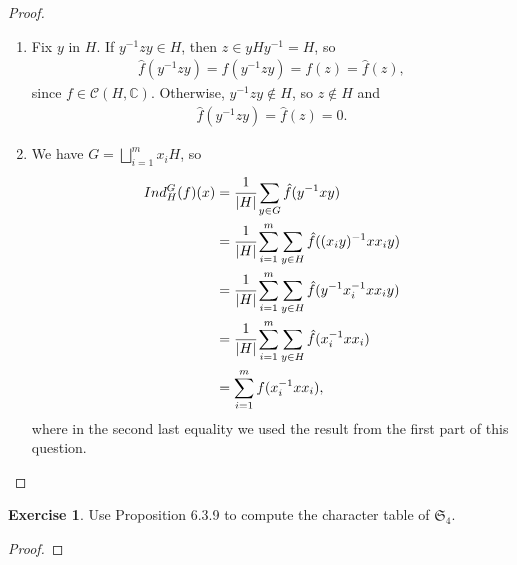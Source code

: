 \documentclass[8pt]{extarticle}
\newcommand{\abs}[1]{|#1|}
\newcommand{\C}{\mathbb{C}}
\newcommand{\<}{\langle}
\renewcommand{\>}{\rangle}
\theoremstyle{definition}
\newtheorem{exercise}{Exercise}
\begin{document}
\begin{proof}
  \begin{enumerate}
  \item
    Fix $y$ in $H$. If $y^{-1}zy \in H$, then $ z \in yHy^{-1}=H$, so
    \begin{align*}
      \hat f(y^{-1}zy) = f(y^{-1}zy) = f(z) = \hat f (z),
    \end{align*}
    since $f \in \mathcal{C}(H,\C)$. Otherwise, $y^{-1}zy \not \in H$, so $z \not \in H$ and
    \begin{align*}
      \hat f(y^{-1}zy) = \hat f(z) = 0.
    \end{align*}
  \item
    We have $G = \bigsqcup\limits_{i=1}^m x_iH$, so
    \begin{align*}
      Ind_H^G(f)(x)
      &=
      \cfrac{1}{\abs{H}} \sum\limits_{y \in G}\hat f (y^{-1}xy) \\
      &=
      \cfrac{1}{\abs{H}} \sum\limits_{i=1}^m \sum\limits_{y \in H}\hat f ((x_i y)^{-1}x x_i y) \\
      &= 
      \cfrac{1}{\abs{H}} \sum\limits_{i=1}^m \sum\limits_{y \in H}\hat f (y^{-1} x_i^{-1}x x_i y) \\
      &=
      \cfrac{1}{\abs{H}} \sum\limits_{i=1}^m \sum\limits_{y \in H}\hat f (x_i^{-1}x x_i) \\
      &=
      \sum\limits_{i=1}^m f (x_i^{-1}x x_i),                         
    \end{align*}
    where in the second last equality we used the result from the first part of this question.
  \end{enumerate}
\end{proof}
\begin{exercise}
  Use Proposition 6.3.9 to compute the character table of $\mathfrak{S}_4$.
\end{exercise}
\begin{proof}
  
\end{proof}
\end{document}
